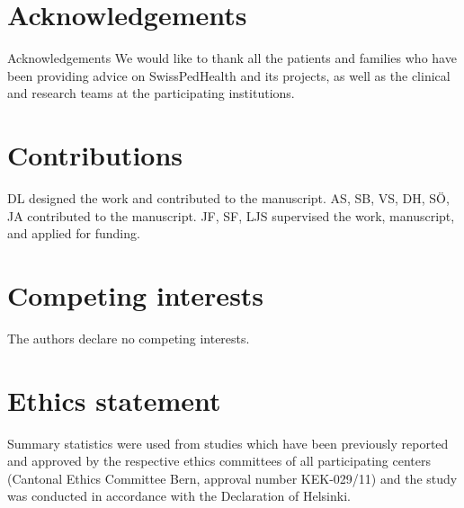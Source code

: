 \section{Acknowledgements}
Acknowledgements We would like to thank all the patients and families who have been providing advice on SwissPedHealth and its projects, as well as the clinical and research teams at the participating institutions.

\section{Contributions}
DL designed the work and contributed to the manuscript.
AS, SB, VS, DH, SÖ, JA contributed to the manuscript.
JF, SF, LJS supervised the work, manuscript, and applied for funding.

\section{Competing interests}
The authors declare no competing interests.

\section{Ethics statement}
Summary statistics were used from studies which have been previously reported and approved by the respective ethics committees of all participating centers (Cantonal Ethics Committee Bern, approval number KEK-029/11) and the study was conducted in accordance with the Declaration of Helsinki.


 


